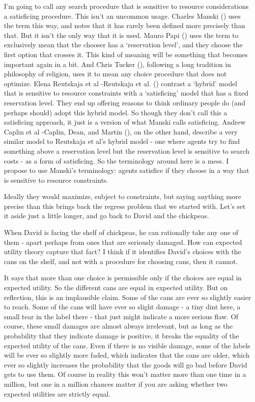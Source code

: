 \documentclass[
  11pt,
  letterpaper,
  DIV=11,
  numbers=noendperiod,
  oneside]{scrartcl}
\begin{document}
I'm going to call any search procedure that is sensitive to resource
considerations a satisficing procedure. This isn't an uncommon usage.
Charles Manski () uses the term this way,
and notes that it has rarely been defined more precisely than that. But
it isn't the only way that it is used. Mauro Papi
() uses the term to exclusively mean that
the chooser has a `reservation level', and they choose the first option
that crosses it. This kind of meaning will be something that becomes
important again in a bit. And Chris Tucker
(), following a long tradition in
philosophy of religion, uses it to mean any choice procedure that does
not optimize. Elena Reutskaja et al -Reutskaja et al.
() contrast a `hybrid' model that is
sensitive to resource constraints with a `satisficing' model that has a
fixed reservation level. They end up offering reasons to think ordinary
people do (and perhaps should) adopt this hybrid model. So though they
don't call this a satisficing approach, it just is a version of what
Manski calls satisficing. Andrew Caplin et al -Caplin, Dean, and Martin
(), on the other hand, describe a very
similar model to Reutskaja et al's hybrid model - one where agents try
to find something above a reservation level but the reservation level is
sensitive to search costs - as a form of satisficing. So the terminology
around here is a mess. I propose to use Manski's terminology: agents
satisfice if they choose in a way that is sensitive to resource
constraints.

Ideally they would maximize, subject to constraints, but saying anything
more precise than this brings back the regress problem that we started
with. Let's set it aside just a little longer, and go back to David and
the chickpeas.

When David is facing the shelf of chickpeas, he can rationally take any
one of them - apart perhaps from ones that are seriously damaged. How
can expected utility theory capture that fact? I think if it identifies
David's choices with the cans on the shelf, and not with a procedure for
choosing cans, then it cannot.

It says that more than one choice is permissible only if the choices are
equal in expected utility. So the different cans are equal in expected
utility. But on reflection, this is an implausible claim. Some of the
cans are ever so slightly easier to reach. Some of the cans will have
ever so slight damage - a tiny dint here, a small tear in the label
there - that just might indicate a more serious flaw. Of course, these
small damages are almost always irrelevant, but as long as the
probability that they indicate damage is positive, it breaks the
equality of the expected utility of the cans. Even if there is no
visible damage, some of the labels will be ever so slightly more faded,
which indicates that the cans are older, which ever so slightly
increases the probability that the goods will go bad before David gets
to use them. Of course in reality this won't matter more than one time
in a million, but one in a million chances matter if you are asking
whether two expected utilities are strictly equal.
\end{document}
